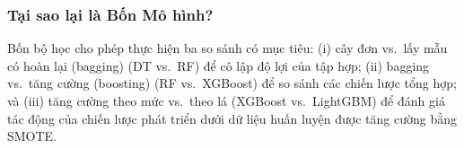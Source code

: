 \subsubsection*{Tại sao lại là Bốn Mô hình?}
Bốn bộ học cho phép thực hiện ba so sánh có mục tiêu: (i) cây đơn vs.\ lấy mẫu có hoàn lại (bagging) (DT vs.\ RF) để cô lập độ lợi của tập hợp; (ii) bagging vs.\ tăng cường (boosting) (RF vs.\ XGBoost) để so sánh các chiến lược tổng hợp; và (iii) tăng cường theo mức vs.\ theo lá (XGBoost vs.\ LightGBM) để đánh giá tác động của chiến lược phát triển dưới dữ liệu huấn luyện được tăng cường bằng SMOTE.
